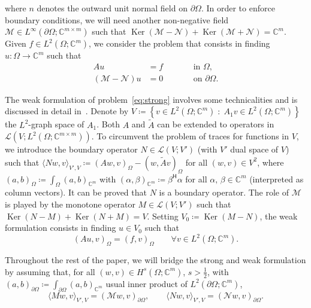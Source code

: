 \documentclass[11pt,a4paper]{article}
\theoremstyle{plain}
\theoremstyle{remark}
\theoremstyle{definition}
\newcommand{\Complex}{\mathbb{C}}
\newcommand{\herm}{\mathsf{H}}
\DeclareMathOperator{\Ker}{Ker}
\newcommand{\st}{\;:\;}
\begin{document}
where $n$ denotes the outward unit normal field on $\partial \Omega$.
In order to enforce boundary conditions, we will need another non-negative field $\mathcal{M} \in L^\infty(\partial \Omega; \Complex^{m\times m})$ such that $\Ker(\mathcal{M} - \mathcal{N}) + \Ker(\mathcal{M} + \mathcal{N}) = \Complex^m$.
Given $f \in L^2(\Omega;\Complex^m)$, we consider the problem that consists in finding $u : \Omega \to \Complex^m$ such that
\begin{equation}\label{eq:strong}
  \begin{alignedat}{2}
    A u &= f &\qquad& \text{in $\Omega$},
    \\
    (\mathcal{M} - \mathcal{N}) u &= 0 &\qquad& \text{on $\partial \Omega$}.
  \end{alignedat}
\end{equation}

The weak formulation of problem~\eqref{eq:strong} involves some technicalities and is discussed in detail in~\cite[Section~56.3]{Ern.Guermond:21*2}.
Denote by $V \coloneqq \left\{ v \in L^2(\Omega;\Complex^m) \st A_1 v \in L^2(\Omega;\Complex^m)\right\}$ the $L^2$-graph space of $A_1$.
Both $A$ and $\tilde{A}$ can be extended to operators in $\mathcal{L}(V;L^2(\Omega;\Complex^{m\times m}))$.
To circumvent the problem of traces for functions in $V$, we introduce the boundary operator $N \in \mathcal{L}(V;V')$ (with $V'$ dual space of $V$) such that $\langle N w, v\rangle_{V',V} \coloneqq (A w, v)_\Omega - (w, \tilde{A} v)_\Omega$ for all $(w,v) \in V^2$, where $(a,b)_\Omega \coloneqq \int_\Omega (a, b)_{\Complex^m}$ with $(\alpha,\beta)_{\Complex^m} \coloneqq \beta^\herm \alpha$ for all $\alpha,\,\beta \in \Complex^m$ (interpreted as column vectors).
It can be proved that $N$ is a boundary operator.
The role of $\mathcal{M}$ is played by the monotone operator $M \in \mathcal{L}(V;V')$ such that $\Ker(N - M) + \Ker(N + M) = V$.
Setting $V_0 \coloneqq \Ker(M - N)$, the weak formulation consists in finding $u \in V_0$ such that
\begin{equation}\label{eq:weak}
  (A u, v)_\Omega = (f, v)_\Omega \qquad \forall v \in L^2(\Omega;\Complex^m).
\end{equation}

Throughout the rest of the paper, we will bridge the strong and weak formulation by assuming that, for all $(w,v) \in H^s(\Omega;\Complex^m)$, $s > \frac12$, with $(a,b)_{\partial \Omega} \coloneqq \int_{\partial \Omega} (a, b)_{\Complex^m} $ usual inner product of $L^2(\partial \Omega; \Complex^m)$,
\[
\langle M w, v\rangle_{V',V} = (\mathcal{M} w, v)_{\partial \Omega},\qquad
\langle N w, v\rangle_{V',V} = (\mathcal{N} w, v)_{\partial \Omega}.
\]
\end{document}
